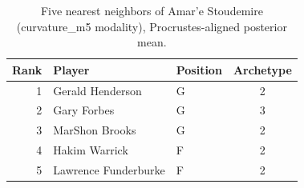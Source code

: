 \begin{table}[htbp]
  \centering\small
  \begin{tabular}{rllc}
    \toprule
    Rank & Player & Position & Archetype \\
    \midrule
    1 & Gerald Henderson & G & 2 \\
    2 & Gary Forbes & G & 3 \\
    3 & MarShon Brooks & G & 2 \\
    4 & Hakim Warrick & F & 2 \\
    5 & Lawrence Funderburke & F & 2 \\
    \bottomrule
  \end{tabular}
  \caption{Five nearest neighbors of Amar'e Stoudemire (curvature_m5 modality), Procrustes-aligned posterior mean.}
  \label{tab:Amar_e_Stoudemire_neighbors_curvature_m5}
\end{table}


